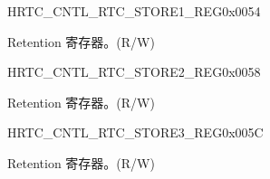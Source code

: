 \begin{register}{H}{RTC\_CNTL\_RTC\_STORE1\_REG}{0x{}0054}\label{regdesc:RTCCNTLRTCSTORE1REG}
%
\regnewline%
\begin{regdesc}\begin{reglist}
\label{fielddesc:RTCCNTLRTCSCRATCH1}\item [RTC\_CNTL\_RTC\_SCRATCH1] Retention 寄存器。(R/W)
\end{reglist}\end{regdesc}
\end{register}


\begin{register}{H}{RTC\_CNTL\_RTC\_STORE2\_REG}{0x{}0058}\label{regdesc:RTCCNTLRTCSTORE2REG}
%
\regnewline%
\begin{regdesc}\begin{reglist}
\label{fielddesc:RTCCNTLRTCSCRATCH2}\item [RTC\_CNTL\_RTC\_SCRATCH2] Retention 寄存器。(R/W)
\end{reglist}\end{regdesc}
\end{register}


\begin{register}{H}{RTC\_CNTL\_RTC\_STORE3\_REG}{0x{}005C}\label{regdesc:RTCCNTLRTCSTORE3REG}
%
\regnewline%
\begin{regdesc}\begin{reglist}
\label{fielddesc:RTCCNTLRTCSCRATCH3}\item [RTC\_CNTL\_RTC\_SCRATCH3] Retention 寄存器。(R/W)
\end{reglist}\end{regdesc}
\end{register}


